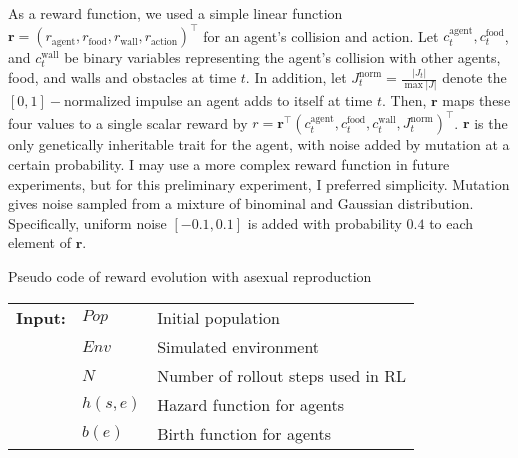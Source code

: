 As a reward function, we used a simple linear function $\mathbf{r} = \left(r_{\textrm{agent}}, r_{\textrm{food}}, r_{\textrm{wall}}, r_{\textrm{action}} \right)^{\intercal} $ for an agent's collision and action. Let $c_{t}^{\textrm{agent}}, c_{t}^{\textrm{food}}$, and $c_{t}^{\textrm{wall}}$ be binary variables representing the agent's collision with other agents, food, and walls and obstacles at time $t$. In addition, let $J_{t}^{\textrm{norm}} = \frac{|J_{t}|}{\max{|J|}}$ denote the $[0, 1]-$normalized impulse an agent adds to itself at time $t$. Then, $\mathbf{r}$ maps these four values to a single scalar reward by $r = \mathbf{r}^{\intercal} (c_{t}^{\textrm{agent}}, c_{t}^{\textrm{food}}, c_{t}^{\textrm{wall}}, J_{t}^{\textrm{norm}})^{\intercal}$. $\mathbf{r}$ is the only genetically inheritable trait for the agent, with noise added by mutation at a certain probability. I may use a more complex reward function in future experiments, but for this preliminary experiment, I preferred simplicity. Mutation gives noise sampled from a mixture of binominal and Gaussian distribution. Specifically, uniform noise $[-0.1, 0.1]$ is added with probability $0.4$ to each element of $\mathbf{r}$.

\begin{algorithm}
  \caption{Pseudo code of reward evolution with asexual reproduction}\label{alg:reward-evo}
  \begin{tabular}{lll}
    \textbf{Input:} & $Pop$ & Initial population \\
                    & $Env$ & Simulated environment \\
                    & $N$ & Number of rollout steps used in RL \\
                    & $h(s, e)$ & Hazard function for agents \\
                    & $b(e)$ & Birth function for agents \\
  \end{tabular}
  \begin{algorithmic}[1]
    \Loop{}
      \EndOnce{}
    \EndFor{}

      \EndWith{}
      \EndWith{}
    \EndFor{}
  \EndLoop{}
\end{algorithmic}
\end{algorithm}

